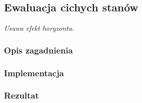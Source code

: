 \subsection{Ewaluacja cichych stanów}
\label{subsec:ewaluacja-cichych-stanow}
\textit{Usuwa efekt horyzontu.}


\subsubsection{Opis zagadnienia}
\subsubsection{Implementacja}
\subsubsection{Rezultat}